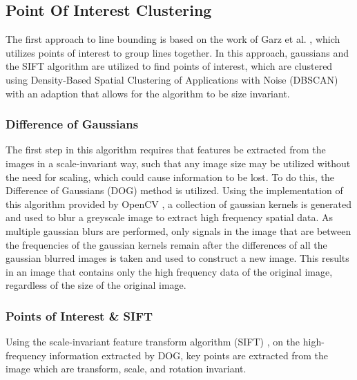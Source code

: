 \subsection{Point Of Interest Clustering}

The first approach to line bounding is based on the work of Garz et al. \cite{Garz2011, Garz2012}, which utilizes points of interest to group lines together. In this approach, gaussians and the SIFT algorithm are utilized to find points of interest, which are clustered using Density-Based Spatial Clustering of Applications with Noise (DBSCAN) \cite{Ester} with an adaption that allows for the algorithm to be size invariant.

\subsubsection{Difference of Gaussians}

The first step in this algorithm requires that features be extracted from the images in a scale-invariant way, such that any image size may be utilized without the need for scaling, which could cause information to be lost. To do this, the Difference of Gaussians (DOG) method is utilized. Using the implementation of this algorithm provided by OpenCV \cite{OpenCV}, a collection of gaussian kernels is generated and used to blur a greyscale image to extract high frequency spatial data. As multiple gaussian blurs are performed, only signals in the image that are between the frequencies of the gaussian kernels remain after the differences of all the gaussian blurred images is taken and used to construct a new image. This results in an image that contains only the high frequency data of the original image, regardless of the size of the original image.

\subsubsection{Points of Interest \& SIFT}

Using the scale-invariant feature transform algorithm (SIFT) \cite{Lowe}, on the high-frequency information extracted by DOG, key points are extracted from the image which are transform, scale, and rotation invariant.


